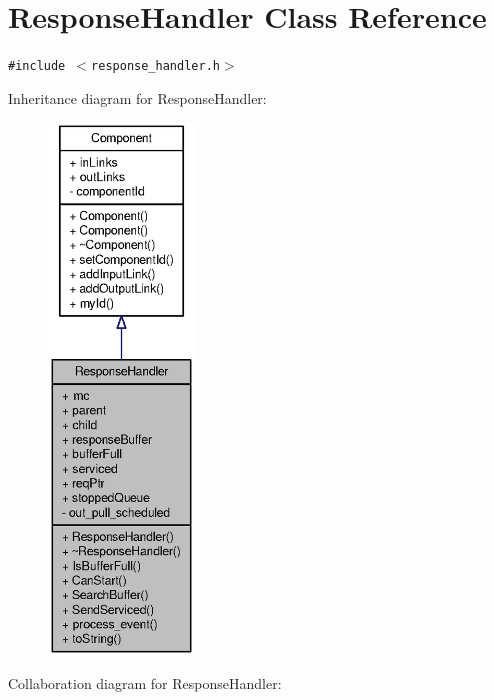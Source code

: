 \section{ResponseHandler Class Reference}
\label{classResponseHandler}
{\tt \#include $<$response\_\-handler.h$>$}

Inheritance diagram for ResponseHandler:\nopagebreak
\begin{figure}[H]
\begin{center}
\leavevmode
\includegraphics[height=400pt]{classResponseHandler__inherit__graph}
\end{center}
\end{figure}
Collaboration diagram for ResponseHandler:\nopagebreak
